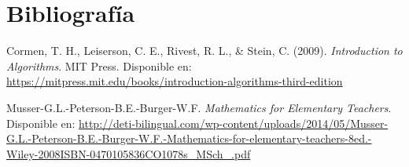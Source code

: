 \documentclass[10pt]{article}
\begin{document}
\section{Bibliografía}

\begin{thebibliography}{9}
Cormen, T. H., Leiserson, C. E., Rivest, R. L., \& Stein, C. (2009). \textit{Introduction to Algorithms}. MIT Press. Disponible en: \url{https://mitpress.mit.edu/books/introduction-algorithms-third-edition}

Musser-G.L.-Peterson-B.E.-Burger-W.F. \textit{Mathematics for Elementary Teachers}. Disponible en: \url{http://deti-bilingual.com/wp-content/uploads/2014/05/Musser-G.L.-Peterson-B.E.-Burger-W.F.-Mathematics-for-elementary-teachers-8ed.-Wiley-2008ISBN-0470105836CO1078s_MSch_.pdf}

\end{thebibliography}
\end{document}
